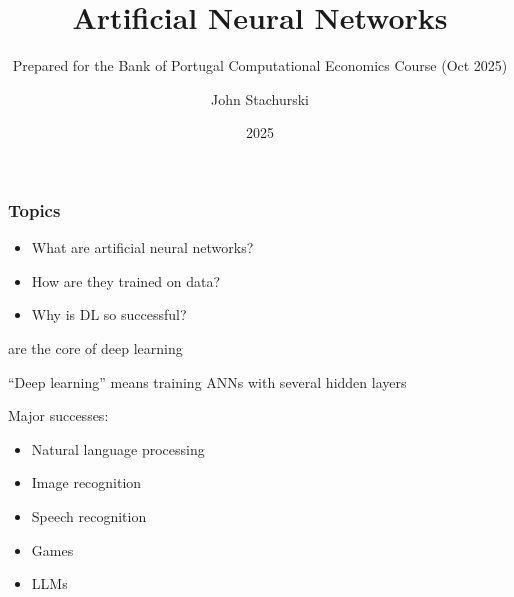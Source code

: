 


\title{Artificial Neural Networks}
\subtitle{Prepared for the Bank of Portugal Computational Economics Course (Oct 2025)}

\author{John Stachurski}


\date{2025}




\begin{frame}
  \titlepage
\end{frame}



\begin{frame}
    \frametitle{Topics}

    \begin{itemize}
        \item What are artificial neural networks?
        \vspace{0.5em}
        \item How are they trained on data?
        \vspace{0.5em}
        \item Why is DL so successful?
        \vspace{0.5em}
    \end{itemize}

\end{frame}


\begin{frame}
    
     are the core of deep learning

        \vspace{0.5em}
    ``Deep learning'' means training ANNs with several hidden layers

        \vspace{0.5em}
    Major successes:
    \begin{itemize}
        \item Natural language processing
        \vspace{0.3em}
        \item Image recognition
        \vspace{0.3em}
        \item Speech recognition
        \vspace{0.3em}
        \item Games
        \vspace{0.3em}
        \item LLMs
    \end{itemize}

\end{frame}

